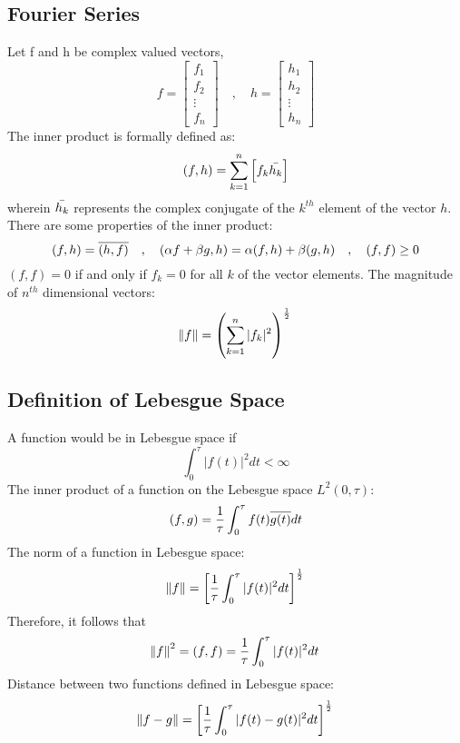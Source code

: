 \documentclass[class=report, 12pt, crop=false]{standalone}
\begin{document}
\begin{center}

\chapter{Fourier Series}
\begin{comment}
Fourier Transform Header
The Fourier Series in Trigonometric form,$$f(t) = \f{1}{2}a_0 + \sum_{n = 1}^{\infty}\l[a_n \cos\l(\f{n\pi}{L}t\r) + b_n \sin\l(\f{n\pi}{L}t\r)\r]$$
\end{comment}
\begin{comment}
\end{comment}
Let f and h be complex valued vectors,$$f = \begin{bmatrix}f_1\\f_2\\\vdots \\f_n \end{bmatrix}\quad,\quad h = \begin{bmatrix}h_1\\h_2\\\vdots \\h_n \end{bmatrix}$$
The inner product is formally defined as:
$$(f,h) = \sum_{k = 1}^{n}\left[f_k\bar{h_k}\right]$$
wherein $\bar{h_k}$ represents the complex conjugate of the $k^{th}$ element of the vector $h$. There are some properties of the inner product:
$$(f,h) = \overline{(h,f)}\quad,\quad (\alpha f + \beta g,h) = \alpha(f,h) + \beta(g,h) \quad,\quad (f,f)\geq0$$
$(f,f) = 0$ if and only if $f_k = 0$ for all $k$ of the vector elements. The magnitude of $n^{th}$ dimensional vectors:
$$\norm{f} = \left(\sum_{k = 1}^{n}|f_k|^2\right)^{\frac{1}{2}}$$
\section{Definition of Lebesgue Space}
\begin{comment}
\end{comment}
A function would be in Lebesgue space if
$$\int^{\tau}_{0}|f(t)|^2dt < \infty$$
The inner product of a function on the Lebesgue space $L^2(0,\tau)$:
$$(f,g) = \frac{1}{\tau}\int^{\tau}_{0}f(t)\overline{g(t)}dt$$
The norm of a function in Lebesgue space:
$$\norm{f} = \left[\frac{1}{\tau}\int^{\tau}_{0}|f(t)|^2dt\right]^\frac{1}{2}$$
Therefore, it follows that 
$$\norm{f}^2 = (f,f) = \frac{1}{\tau}\int^{\tau}_{0}|f(t)|^2dt$$
Distance between two functions defined in Lebesgue space:
$$\norm{f - g} = \left[\frac{1}{\tau}\int^{\tau}_{0}|f(t) - g(t)|^2dt\right]^\frac{1}{2}$$

\end{center}
\end{document}
